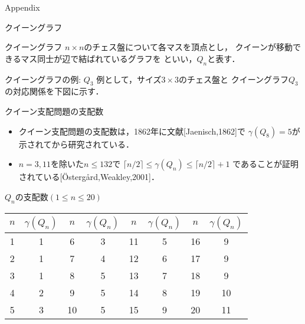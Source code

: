 \appendix
\backupbegin

\begin{frame}{}\Huge
 Appendix
\end{frame}

\begin{frame}{クイーングラフ}
 \begin{block}{クイーングラフ}
  $n\times n$のチェス盤について各マスを頂点とし，
  クイーンが移動できるマス同士が辺で結ばれているグラフを
  といい，$Q_n$と表す．
 \end{block}
 \begin{exampleblock}{クイーングラフの例: $Q_3$}
  例として，サイズ$3 \times 3$のチェス盤と
  クイーングラフ$Q_3$の対応関係を下図に示す．
  \begin{figure}[htb]
   \label{ex:queengraph_3}
   \begin{minipage}[b]{0.2\linewidth}
    \centering
    
   \end{minipage} 
   \begin{minipage}[b]{0.5\linewidth}
    \centering
    
   \end{minipage}
  \end{figure}
 \end{exampleblock}
\end{frame}


%
%

\begin{frame}{クイーン支配問題の支配数}
  \begin{itemize}
    \item クイーン支配問題の支配数は，1862年に文献[Jaenisch,1862]で
	    $\gamma(Q_8)=5$が示されてから研究されている．
    \item $n=3,11$を除いた$n \leq 132$で $\lceil n/2 \rceil 
	    \leq \gamma(Q_{n}) \leq \lceil n/2 \rceil +1$
	 であることが証明されている[\"{O}sterg{\aa}rd,Weakley,2001]．
  \end{itemize}
 \begin{exampleblock}{$Q_{n}$の支配数$(1 \leq n \leq 20)$}
  \centering
  \begin{tabular}{c|c||c|c||c|c||c|c}%
    $n$ & $\gamma(Q_{n})$ & $n$ & $\gamma(Q_{n})$ &$n$ & $\gamma(Q_{n})$ &$n$ & $\gamma(Q_{n})$ \\ \hline
    1 &1 &6 &3 &11 &5 &16 &9 \\ %
    2 &1 &7 &4 &12 &6 &17 &9 \\ %
    3 &1 &8 &5 &13 &7 &18 &9 \\ %
    4 &2 &9 &5 &14 &8 &19 &10 \\ %
    5 &3 &10 &5 &15 &9 &20 &11 \\ %
  \end{tabular}
 \end{exampleblock}
\end{frame}



